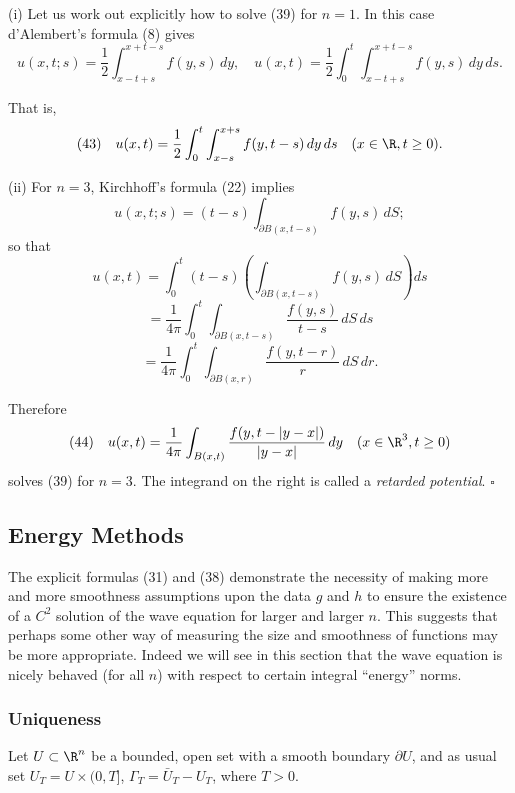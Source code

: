 \begin{example}[Nonhomogeneous wave equation for $n=1,3$]
\label{ex:wave-equation-nonhomogeneous-n1-n3}
(i) Let us work out explicitly how to solve (39) for $n = 1$. In this case d'Alembert's formula (8) gives
$$u(x, t; s) = \frac{1}{2} \int_{x-t+s}^{x+t-s} f(y, s) \, dy, \quad u(x,t) = \frac{1}{2} \int_0^t \int_{x-t+s}^{x+t-s} f(y, s) \, dy\,ds.$$

That is,
$$(43) \quad u(x,t) = \frac{1}{2} \int_0^t \int_{x-s}^{x+s} f(y, t-s) \, dy\,ds \quad (x \in \R, t \geq 0).$$

(ii) For $n = 3$, Kirchhoff's formula (22) implies
$$u(x, t; s) = (t-s) \int_{\partial B(x,t-s)} f(y, s) \, dS;$$
so that
$$u(x,t) = \int_0^t (t-s) \left(\int_{\partial B(x,t-s)} f(y, s) \, dS\right) ds$$
$$= \frac{1}{4\pi} \int_0^t \int_{\partial B(x,t-s)} \frac{f(y, s)}{t-s} \, dS\,ds$$
$$= \frac{1}{4\pi} \int_0^t \int_{\partial B(x,r)} \frac{f(y, t-r)}{r} \, dS\,dr.$$

Therefore
$$(44) \quad u(x,t) = \frac{1}{4\pi} \int_{B(x,t)} \frac{f(y, t - |y - x|)}{|y - x|} \, dy \quad (x \in \R^3, t \geq 0)$$
solves (39) for $n = 3$. The integrand on the right is called a \textit{retarded potential}. $\square$
\end{example}

\subsection{Energy Methods}
\label{sec:wave-energy-methods}

The explicit formulas (31) and (38) demonstrate the necessity of making more and more smoothness assumptions upon the data $g$ and $h$ to ensure the existence of a $C^2$ solution of the wave equation for larger and larger $n$. This suggests that perhaps some other way of measuring the size and smoothness of functions may be more appropriate. Indeed we will see in this section that the wave equation is nicely behaved (for all $n$) with respect to certain integral ``energy'' norms.

\subsubsection{Uniqueness}
\label{sec:wave-energy-uniqueness}

Let $U \subset \R^n$ be a bounded, open set with a smooth boundary $\partial U$, and as usual set $U_T = U \times (0,T]$, $\Gamma_T = \bar{U}_T - U_T$, where $T > 0$.

